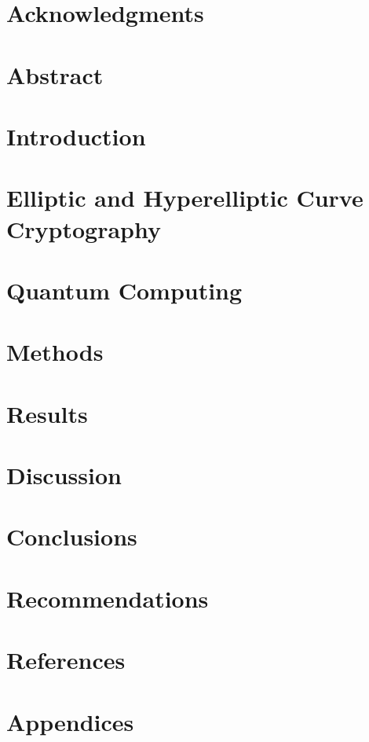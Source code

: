 \documentclass[10pt]{article}
\begin{document}

\restoregeometry

\section{Acknowledgments}

\pagebreak

\setcounter{tocdepth}{5}
\tableofcontents
\pagebreak

\listoffigures
\listoftables
\pagebreak

\justify

\section*{Abstract}

\pagebreak

\section{Introduction}


\section{Elliptic and Hyperelliptic Curve Cryptography}


\section{Quantum Computing}


\section{Methods}


\section{Results}


\section{Discussion}


\section{Conclusions}


\section{Recommendations}


\pagebreak
\section{References}
\label{sec:ref}



\pagebreak
\section{Appendices}

\end{document}
